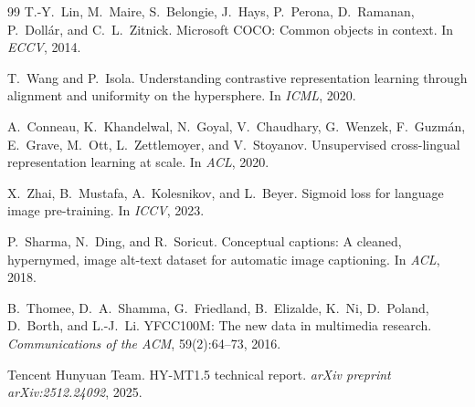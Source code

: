 \documentclass[10pt,leqno]{amsart}
\begin{document}
\begin{thebibliography}{99}
T.-Y.~Lin, M.~Maire, S.~Belongie, J.~Hays, P.~Perona, D.~Ramanan, P.~Dollár, and C.~L.~Zitnick.
\newblock Microsoft COCO: Common objects in context.
\newblock In \textit{ECCV}, 2014.

T.~Wang and P.~Isola.
\newblock Understanding contrastive representation learning through alignment and uniformity on the hypersphere.
\newblock In \textit{ICML}, 2020.

A.~Conneau, K.~Khandelwal, N.~Goyal, V.~Chaudhary, G.~Wenzek, F.~Guzmán, E.~Grave, M.~Ott, L.~Zettlemoyer, and V.~Stoyanov.
\newblock Unsupervised cross-lingual representation learning at scale.
\newblock In \textit{ACL}, 2020.

X.~Zhai, B.~Mustafa, A.~Kolesnikov, and L.~Beyer.
\newblock Sigmoid loss for language image pre-training.
\newblock In \textit{ICCV}, 2023.

P.~Sharma, N.~Ding, and R.~Soricut.
\newblock Conceptual captions: A cleaned, hypernymed, image alt-text dataset for
  automatic image captioning.
\newblock In \textit{ACL}, 2018.

B.~Thomee, D.~A.~Shamma, G.~Friedland, B.~Elizalde, K.~Ni, D.~Poland,
  D.~Borth, and L.-J.~Li.
\newblock YFCC100M: The new data in multimedia research.
\newblock \textit{Communications of the ACM}, 59(2):64--73, 2016.

Tencent Hunyuan Team.
\newblock HY-MT1.5 technical report.
\newblock \textit{arXiv preprint arXiv:2512.24092}, 2025.

\end{thebibliography}
\end{document}
